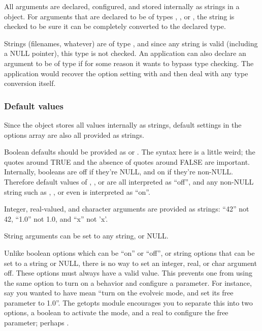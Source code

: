 All arguments are declared, configured, and stored internally as
strings in a  object. For arguments that are
declared to be of types , , or
, the string is checked to be sure it can be
completely converted to the declared type.

Strings (filenames, whatever) are of type , and
since any string is valid (including a NULL pointer), this type is not
checked. An application can also declare an argument to be of type
 if for some reason it wants to bypass type
checking. The application would recover the option setting with
 and then deal with any type
conversion itself.

   \subsubsection{Default values}

Since the  object stores all values internally as
strings, default settings in the options array are also all provided
as strings.

Boolean defaults should be provided as  or
.  The syntax here is a little weird; the quotes
around TRUE and the absence of quotes around FALSE are
important. Internally, booleans are off if they're NULL, and on if
they're non-NULL. Therefore default values of ,
, or  are all interpreted as ``off'', and any
non-NULL string such as , , or even
 is interpreted as ``on''.

Integer, real-valued, and character arguments are provided as strings:
``42'' not 42, ``1.0'' not 1.0, and ``x'' not 'x'. 

String arguments can be set to any string, or NULL. 

Unlike boolean options which can be ``on'' or ``off'', or string
options that can be set to a string or NULL, there is no way to set an
integer, real, or char argument off. These options must always have a
valid value. This prevents one from using the same option to turn on a
behavior and configure a parameter. For instance, say you wanted to
have  mean ``turn on the evolveic mode,
and set its free parameter to 1.0''. The getopts module encourages you
to separate this into two options, a boolean to activate the mode, and
a real to configure the free parameter; perhaps .

